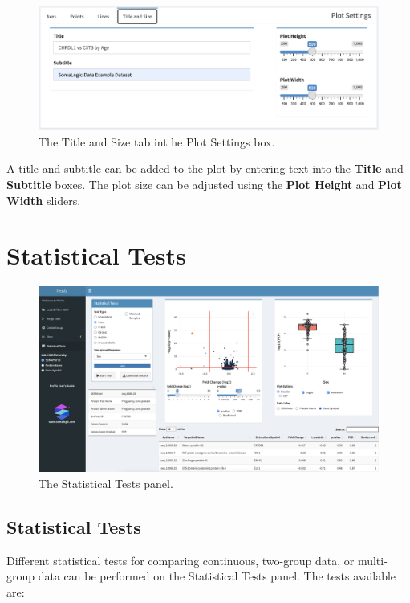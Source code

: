 \documentclass[
]{book}
\begin{document}
\begin{figure}
\centering
\includegraphics{images/Scatter_TitleSize.png}
\caption{The Title and Size tab int he Plot Settings box.}
\end{figure}

A title and subtitle can be added to the plot by entering text into the \textbf{Title} and \textbf{Subtitle} boxes. The plot size can be adjusted using the \textbf{Plot Height} and \textbf{Plot Width} sliders.

\hypertarget{statistical-tests}{%
\chapter{Statistical Tests}\label{statistical-tests}}

\begin{figure}
\centering
\includegraphics{images/StatTest_panel.png}
\caption{The Statistical Tests panel.}
\end{figure}

\hypertarget{statistical-tests-1}{%
\section{Statistical Tests}\label{statistical-tests-1}}

Different statistical tests for comparing continuous, two-group data, or multi-group data can be performed on the Statistical Tests panel. The tests available are:
\end{document}
